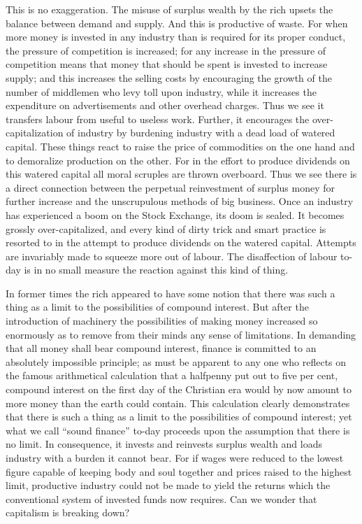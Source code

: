 \documentclass{book}
\begin{document}
This is no exaggeration. The misuse of surplus wealth by the rich upsets the balance between demand and supply. And this is productive of waste. For when more money is invested in any industry than is required for its proper conduct, the pressure of competition is increased; for any increase in the pressure of competition means that money that should be spent is invested to increase supply; and this increases the selling costs by encouraging the growth of the number of middlemen who levy toll upon industry, while it increases the expenditure on advertisements and other overhead charges. Thus we see it transfers labour from useful to useless work. Further, it encourages the over-capitalization of industry by burdening industry with a dead load of watered capital. These things react to raise the price of commodities on the one hand and to demoralize production on the other. For in the effort to produce dividends on this watered capital all moral scruples are thrown overboard. Thus we see there is a direct connection between the perpetual reinvestment of surplus money for further increase and the unscrupulous methods of big business. Once an industry has experienced a boom on the Stock Exchange, its doom is sealed. It becomes grossly over-capitalized, and every kind of dirty trick and smart practice is resorted to in the attempt to produce dividends on the watered capital. Attempts are invariably made to squeeze more out of labour. The disaffection of labour to-day is in no small measure the reaction against this kind of thing.

In former times the rich appeared to have some notion that there was such a thing as a limit to the possibilities of compound interest. But after the introduction of machinery the possibilities of making money increased so enormously as to remove from their minds any sense of limitations. In demanding that all money shall bear compound interest, finance is committed to an absolutely impossible principle; as must be apparent to any one who reflects on the famous arithmetical calculation that a halfpenny put out to five per cent, compound interest on the first day of the Christian era would by now amount to more money than the earth could contain. This calculation clearly demonstrates that there is such a thing as a limit to the possibilities of compound interest; yet what we call “sound finance” to-day proceeds upon the assumption that there is no limit. In consequence, it invests and reinvests surplus wealth and loads industry with a burden it cannot bear. For if wages were reduced to the lowest figure capable of keeping body and soul together and prices raised to the highest limit, productive industry could not be made to yield the returns which the conventional system of invested funds now requires. Can we wonder that capitalism is breaking down?
\end{document}
